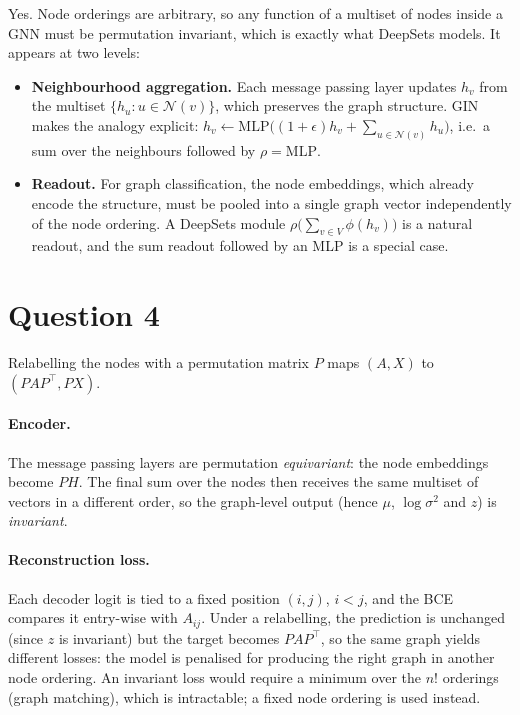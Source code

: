 \documentclass[a4paper]{article}
\begin{document}
Yes. Node orderings are arbitrary, so any function of a multiset of nodes inside a GNN must be permutation invariant, which is exactly what DeepSets models. It appears at two levels:
\begin{itemize}
    \item \textbf{Neighbourhood aggregation.} Each message passing layer updates $h_v$ from the multiset $\{h_u : u \in \mathcal{N}(v)\}$, which preserves the graph structure. GIN makes the analogy explicit: $h_v \leftarrow \mathrm{MLP}\big((1+\epsilon) h_v + \sum_{u \in \mathcal{N}(v)} h_u\big)$, i.e.\ a sum over the neighbours followed by $\rho = \mathrm{MLP}$.
    \item \textbf{Readout.} For graph classification, the node embeddings, which already encode the structure, must be pooled into a single graph vector independently of the node ordering. A DeepSets module $\rho\big(\sum_{v \in V} \phi(h_v)\big)$ is a natural readout, and the sum readout followed by an MLP is a special case.
\end{itemize}


\section{Question 4}

Relabelling the nodes with a permutation matrix $P$ maps $(A, X)$ to $(PAP^\top, PX)$.

\paragraph{Encoder.} The message passing layers are permutation \emph{equivariant}: the node embeddings become $PH$. The final sum over the nodes then receives the same multiset of vectors in a different order, so the graph-level output (hence $\mu$, $\log\sigma^2$ and $z$) is \emph{invariant}.

\paragraph{Reconstruction loss.} Each decoder logit is tied to a fixed position $(i, j)$, $i < j$, and the BCE compares it entry-wise with $A_{ij}$. Under a relabelling, the prediction is unchanged (since $z$ is invariant) but the target becomes $PAP^\top$, so the same graph yields different losses: the model is penalised for producing the right graph in another node ordering. An invariant loss would require a minimum over the $n!$ orderings (graph matching), which is intractable; a fixed node ordering is used instead.
\end{document}
